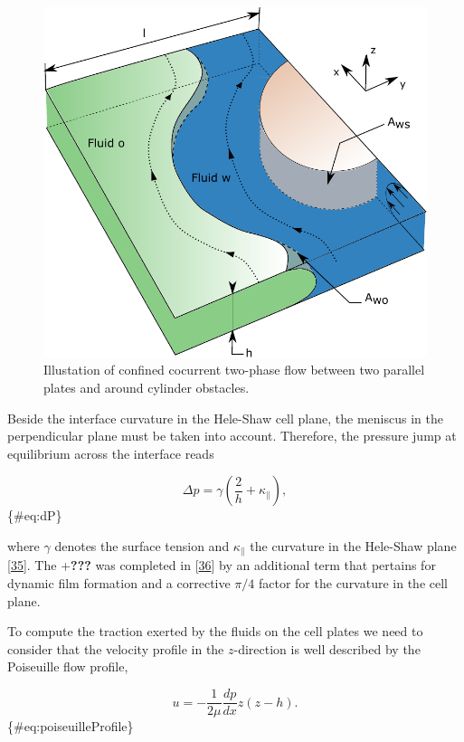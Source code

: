 \documentclass[]{article}
\begin{document}
\begin{figure}
\hypertarget{fig:modelStudy}{%
\centering
\includegraphics{figures/pdf/dessin_courbure.pdf}
\caption{Illustation of confined cocurrent two-phase flow between two
parallel plates and around cylinder obstacles.}\label{fig:modelStudy}
}
\end{figure}

Beside the interface curvature in the Hele-Shaw cell plane, the meniscus
in the perpendicular plane must be taken into account. Therefore, the
pressure jump at equilibrium across the interface reads

\[
\Delta p = \gamma \left(\frac{2}{h}+\kappa_{\parallel}\right),
\] \{\#eq:dP\}

where \(\gamma\) denotes the surface tension and \(\kappa_{\parallel}\)
the curvature in the Hele-Shaw plane
{[}\protect\hyperlink{ref-saffman1958penetration}{35}{]}. The
+\textbf{???} was completed in
{[}\protect\hyperlink{ref-park1984two}{36}{]} by an additional term that
pertains for dynamic film formation and a corrective \(\pi/4\) factor
for the curvature in the cell plane.

To compute the traction exerted by the fluids on the cell plates we need
to consider that the velocity profile in the \(z\)-direction is well
described by the Poiseuille flow profile,

\[
u=-\frac{1}{2\mu}\frac{dp}{dx}z(z-h).
\] \{\#eq:poiseuilleProfile\}
\end{document}
